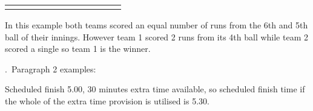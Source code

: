 \documentclass[12pt]{article}
\begin{document}
\begin{table}[H]
\begin{tabular}{p{0.54in}p{0.54in}p{0.54in}p{0.54in}p{0.54in}p{0.54in}p{0.54in}p{0.54in}p{0.54in}p{0.54in}p{0.54in}p{0.54in}}
\hhline{~~~}
\multicolumn{1}{p{0.54in}}{} & 
\multicolumn{1}{p{0.54in}}{} & 
\multicolumn{1}{p{0.54in}}{} & 

\hhline{~~~}
\multicolumn{1}{p{0.54in}}{{\fontsize{9pt}{10.8pt}\selectfont Ball 1}} & 
\multicolumn{1}{p{0.54in}}{{\fontsize{9pt}{10.8pt}\selectfont 2}} & 
\multicolumn{1}{p{0.54in}}{{\fontsize{9pt}{10.8pt}\selectfont 6}} & 

\hhline{~~~}
\multicolumn{1}{p{0.54in}}{} & 
\multicolumn{1}{p{0.54in}}{} & 
\multicolumn{1}{p{0.54in}}{} & 

\hhline{~~~}

\end{tabular}
 \end{table}




\vspace{\baselineskip}
\begin{adjustwidth}{0.25in}{0.17in}
{\fontsize{9pt}{10.8pt}\selectfont In this example both teams scored an equal number of runs from the 6th and 5th ball of their innings. However team 1 scored 2 runs from its 4th ball while team 2 scored a single so team 1 is the winner.\par}\par

\end{adjustwidth}


\vspace{\baselineskip}
\begin{adjustwidth}{0.25in}{0.0in}
{\fontsize{9pt}{10.8pt}.\  Paragraph 2 examples:\par}\par

\end{adjustwidth}


\vspace{\baselineskip}
\begin{adjustwidth}{0.25in}{0.26in}
{\fontsize{9pt}{10.8pt}\selectfont Scheduled finish 5.00, 30 minutes extra time available, so scheduled finish time if the whole of the extra time provision is utilised is 5.30.\par}\par

\end{adjustwidth}
\end{document}
